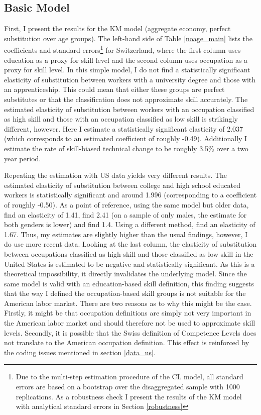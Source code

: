 \documentclass[]{article}
\begin{document}
\subsection{Basic Model}
First, I present the results for the KM model (aggregate economy,
perfect substitution over age groups). The left-hand side of Table
\ref{noage_main} lists the coefficients and standard
errors\footnote{Due to the multi-step estimation procedure of the CL
  model, all standard errors are based on a bootstrap over the
  disaggregated sample with 1000 replications. As a robustness check I
  present the results of the KM model with analytical standard errors
  in Section \ref{robustness}} for Switzerland, where the first column
uses education as a proxy for skill level and the second column uses
occupation as a proxy for skill level. In this simple model, I do not
find a statistically significant elasticity of substitution between
workers with a university degree and those with an
apprenticeship. This could mean that either these groups are perfect
substitutes or that the classification does not approximate skill
accurately. The estimated elasticity of substitution between workers
with an occupation classified as high skill and those with an
occupation classified as low skill is strikingly different,
however. Here I estimate a statistically significant elasticity of
2.037 (which corresponds to an estimated coefficient of roughly
-0.49). Additionally I estimate the rate of skill-biased technical
change to be roughly 3.5\% over a two year period.

Repeating the estimation with US data yields very different
results. The estimated elasticity of substitution between college and
high school educated workers is statistically significant and around
1.996 (corresponding to a coefficient of roughly -0.50).  As a point
of reference, using the same model but older data, \cite{Katz.1992}
find an elasticity of 1.41, \cite{Card.2001} find 2.41 (on a sample of
only males, the estimate for both genders is lower) and
\cite{Blankenau.2011} find 1.4. Using a different method,
\cite{PerKrusell.2000} find an elasticity of 1.67. Thus, my estimates
are slightly higher than the usual findings, however, I do use more
recent data. Looking at the last column, the elasticity of
substitution between occupations classified as high skill and those
classified as low skill in the United States is estimated to be
negative and statistically significant.  As this is a theoretical
impossibility, it directly invalidates the underlying model. Since the
same model is valid with an education-based skill definition, this
finding suggests that the way I defined the occupation-based skill
groups is not suitable for the American labor market. There are two
reasons as to why this might be the case. Firstly, it might be that
occupation definitions are simply not very important in the American
labor market and should therefore not be used to approximate skill
levels. Secondly, it is possible that the Swiss definition of
Competence Levels does not translate to the American occupation
definition. This effect is reinforced by the coding issues mentioned
in section \ref{data_us}.
\end{document}
